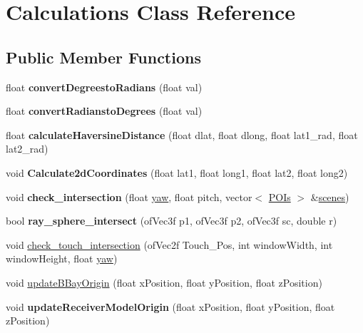 \hypertarget{class_calculations}{\section{Calculations Class Reference}
\label{class_calculations}
}
\subsection*{Public Member Functions}
\begin{DoxyCompactItemize}
\item 
\hypertarget{class_calculations_ac8666b1e2fb424dcd21d26d1db753c9e}{float {\bfseries convert\-Degreesto\-Radians} (float val)}\label{class_calculations_ac8666b1e2fb424dcd21d26d1db753c9e}

\item 
\hypertarget{class_calculations_a2a475c3b2096e2bef3fa1c503a0d6f33}{float {\bfseries convert\-Radiansto\-Degrees} (float val)}\label{class_calculations_a2a475c3b2096e2bef3fa1c503a0d6f33}

\item 
\hypertarget{class_calculations_acd0920de0b16194317966bab3714b468}{float {\bfseries calculate\-Haversine\-Distance} (float dlat, float dlong, float lat1\-\_\-rad, float lat2\-\_\-rad)}\label{class_calculations_acd0920de0b16194317966bab3714b468}

\item 
\hypertarget{class_calculations_a38fbecc378883ac235029f3ed486e11b}{void {\bfseries Calculate2d\-Coordinates} (float lat1, float long1, float lat2, float long2)}\label{class_calculations_a38fbecc378883ac235029f3ed486e11b}

\item 
\hypertarget{class_calculations_a55c4865df3581c1bcd6143dfc8469bd7}{void {\bfseries check\-\_\-intersection} (float \hyperlink{test_app_8cpp_a7efc219781df4a1e281cb5d348b7fbf9}{yaw}, float pitch, vector$<$ \hyperlink{class_p_o_is}{P\-O\-Is} $>$ \&\hyperlink{test_app_8cpp_a2a45ec4ebd7ddda05fdd49eb42148544}{scenes})}\label{class_calculations_a55c4865df3581c1bcd6143dfc8469bd7}

\item 
\hypertarget{class_calculations_a85384e54e773cd547fcc4b63d5f0ff3b}{bool {\bfseries ray\-\_\-sphere\-\_\-intersect} (of\-Vec3f p1, of\-Vec3f p2, of\-Vec3f sc, double r)}\label{class_calculations_a85384e54e773cd547fcc4b63d5f0ff3b}

\item 
void \hyperlink{class_calculations_abaf3fb671ac5804f0351ee1e7b8e4400}{check\-\_\-touch\-\_\-intersection} (of\-Vec2f Touch\-\_\-\-Pos, int window\-Width, int window\-Height, float \hyperlink{test_app_8cpp_a7efc219781df4a1e281cb5d348b7fbf9}{yaw})
\item 
void \hyperlink{class_calculations_a17d1676ec8479e11289694ba8a7c40f8}{update\-B\-Bay\-Origin} (float x\-Position, float y\-Position, float z\-Position)
\item 
\hypertarget{class_calculations_a134141ed8db8810f13841375fb631f69}{void {\bfseries update\-Receiver\-Model\-Origin} (float x\-Position, float y\-Position, float z\-Position)}\label{class_calculations_a134141ed8db8810f13841375fb631f69}


\end{DoxyCompactItemize}
